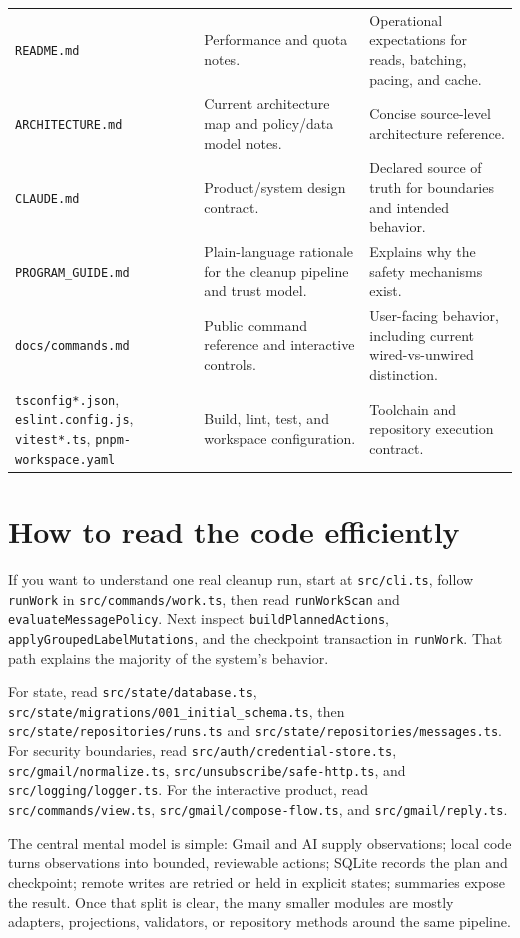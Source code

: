 \documentclass[12pt,oneside]{book}
\newcommand{\code}[1]{\nolinkurl{#1}}
\newcommand{\file}[1]{\nolinkurl{#1}}
\begin{document}
\begin{longtable}{P{4.0cm}P{5.6cm}P{6.8cm}}
\file{README.md} & Performance and quota notes. & Operational expectations for reads, batching, pacing, and cache. \\
\file{ARCHITECTURE.md} & Current architecture map and policy/data model notes. & Concise source-level architecture reference. \\
\file{CLAUDE.md} & Product/system design contract. & Declared source of truth for boundaries and intended behavior. \\
\file{PROGRAM_GUIDE.md} & Plain-language rationale for the cleanup pipeline and trust model. & Explains why the safety mechanisms exist. \\
\file{docs/commands.md} & Public command reference and interactive controls. & User-facing behavior, including current wired-vs-unwired distinction. \\
\file{tsconfig*.json}, \file{eslint.config.js}, \file{vitest*.ts}, \file{pnpm-workspace.yaml} & Build, lint, test, and workspace configuration. & Toolchain and repository execution contract. \\
\bottomrule
\end{longtable}
\endgroup

\chapter{How to read the code efficiently}

If you want to understand one real cleanup run, start at \file{src/cli.ts}, follow \code{runWork} in \file{src/commands/work.ts}, then read \code{runWorkScan} and \code{evaluateMessagePolicy}. Next inspect \code{buildPlannedActions}, \code{applyGroupedLabelMutations}, and the checkpoint transaction in \code{runWork}. That path explains the majority of the system's behavior.

For state, read \file{src/state/database.ts}, \file{src/state/migrations/001_initial_schema.ts}, then \file{src/state/repositories/runs.ts} and \file{src/state/repositories/messages.ts}. For security boundaries, read \file{src/auth/credential-store.ts}, \file{src/gmail/normalize.ts}, \file{src/unsubscribe/safe-http.ts}, and \file{src/logging/logger.ts}. For the interactive product, read \file{src/commands/view.ts}, \file{src/gmail/compose-flow.ts}, and \file{src/gmail/reply.ts}.

The central mental model is simple: Gmail and AI supply observations; local code turns observations into bounded, reviewable actions; SQLite records the plan and checkpoint; remote writes are retried or held in explicit states; summaries expose the result. Once that split is clear, the many smaller modules are mostly adapters, projections, validators, or repository methods around the same pipeline.
\end{document}
